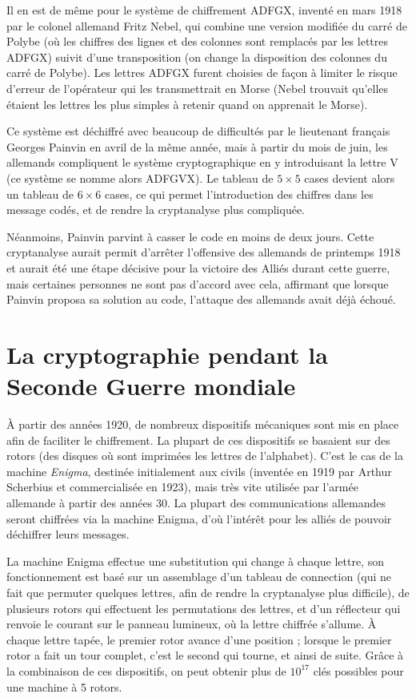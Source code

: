 Il en est de même pour le système de chiffrement ADFGX, inventé en
mars 1918 par le colonel allemand Fritz %
Nebel, qui combine une version modifiée
du carré de Polybe (où les chiffres des
lignes et des colonnes sont remplacés par les lettres ADFGX) suivit d'une
transposition (on change la disposition
des colonnes du carré de Polybe). Les lettres ADFGX furent choisies de
façon à limiter le risque d'erreur de l'opérateur qui les
transmettrait en Morse (Nebel trouvait qu'elles étaient les lettres
les plus simples à retenir quand on apprenait le Morse).

Ce système est déchiffré avec beaucoup de difficultés par le
lieutenant français Georges Painvin en avril de la même année, mais à
partir du mois de juin, les allemands compliquent le système
cryptographique en y introduisant la lettre V (ce système se nomme
alors ADFGVX). Le tableau de $5\times 5$ cases devient alors un tableau
de $6\times 6$ cases, ce qui permet l'introduction des chiffres dans
les message codés, et de rendre la cryptanalyse plus
compliquée.

Néanmoins, Painvin parvint à casser le code en moins de
deux jours. Cette cryptanalyse aurait permit d'arrêter l'offensive
des allemands de printemps 1918 et aurait été une étape décisive pour
la victoire des Alliés durant cette guerre, mais certaines personnes
ne sont pas d'accord avec cela, affirmant que lorsque Painvin proposa
sa solution au code, l'attaque des allemands avait déjà échoué. 
\section{La cryptographie pendant la Seconde Guerre mondiale}
À partir des années 1920, de nombreux dispositifs mécaniques sont mis
en place afin de faciliter le chiffrement. La plupart de ces
dispositifs se basaient sur des rotors (des disques où sont imprimées
les lettres de l'alphabet). C'est le cas de la machine \emph{Enigma},
destinée initialement aux civils (inventée en 1919 par Arthur
Scherbius et commercialisée en 1923), mais très vite utilisée par
l'armée allemande à partir des années 30. La plupart des
communications allemandes seront chiffrées via la machine Enigma, d'où
l'intérêt pour les alliés de pouvoir déchiffrer leurs messages.

La machine Enigma effectue une substitution qui change à chaque
lettre, son fonctionnement est basé sur un assemblage d'un tableau de
connection (qui ne fait que permuter quelques lettres, afin de rendre
la cryptanalyse plus difficile), de plusieurs rotors qui effectuent
les permutations des lettres, et d'un réflecteur qui renvoie le courant
sur le panneau lumineux, où la lettre chiffrée s'allume. À chaque
lettre tapée, le premier rotor avance d'une position ; lorsque le
premier rotor a fait un tour complet, c'est le second qui tourne, et
ainsi de suite. Grâce à la combinaison de ces dispositifs, on peut
obtenir plus de $10^{17}$ clés possibles pour une machine à 5 rotors.


